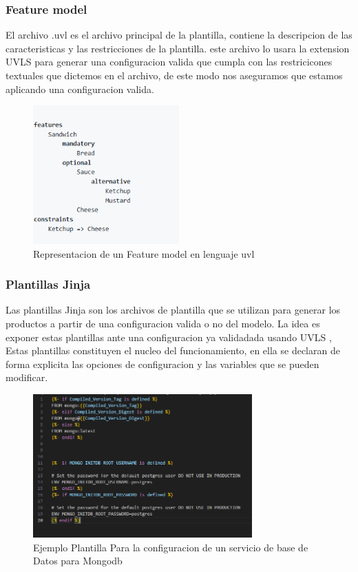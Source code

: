 \documentclass[12pt, a4paper, twoside]{article}
\begin{document}
\subsubsection{Feature model}
El archivo .uvl es el archivo principal de la plantilla, contiene la descripcion de las caracteristicas y las restricciones de la plantilla.
este archivo lo usara la extension UVLS \cite{uvls_code} para generar una configuracion valida que cumpla con las restricicones textuales que dictemos en el archivo, de este modo nos aseguramos que estamos aplicando una configuracion valida.
\begin{figure}[ht]
	\centering
		\includegraphics[width=0.5\textwidth]{text.feature_model.png}
	\caption{Representacion de un Feature model en lenguaje uvl \cite{uvl}}
\end{figure}

\newpage

\subsubsection{Plantillas Jinja}
Las plantillas Jinja son los archivos de plantilla que se utilizan para generar los productos a partir de una configuracion valida o no del modelo.
La idea es exponer estas plantillas ante una configuracion ya validadada usando UVLS \cite{uvls_code}, Estas plantillas constituyen el nucleo del funcionamiento, en ella se declaran de forma explicita las opciones de configuracion y las variables que se pueden modificar.

\begin{figure}[h]
	\centering
		\includegraphics[width=0.75\textwidth]{jinja_template_database_mongodb.png}
	\caption{Ejemplo Plantilla Para la configuracion de un servicio de base de Datos para Mongodb}
\end{figure}
\end{document}
